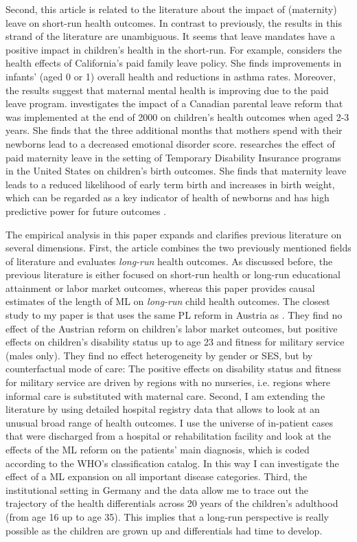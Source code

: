 \documentclass[11pt, a4paper,draft]{article} %
\begin{document}
Second, this article is related to the literature about the impact of (maternity) leave on short-run health outcomes. In contrast to previously, the results in  this strand of the literature are unambiguous. It seems that leave mandates have a positive impact in children's health in the short-run. For example, \cite{bullinger2019effect} considers the health effects of California's paid family leave policy. She finds improvements in infants' (aged 0 or 1) overall health and reductions in asthma rates. Moreover, the results suggest that maternal mental health is improving due to the paid leave program. \cite{sayour2019impact} investigates the impact of a Canadian parental leave reform that was implemented at the end of 2000 on children's health outcomes when aged 2-3 years. She finds that the three additional months that mothers spend with their newborns lead to a decreased emotional disorder score. \cite{stearns2015effects} researches the effect of paid maternity leave in the setting of Temporary Disability Insurance programs in the United States on children's birth outcomes. She finds that maternity leave leads to a reduced likelihood of early term birth and increases in birth weight, which can be regarded as a key indicator of health of newborns and has high predictive power for future outcomes \citep{currie2007biology}.

The empirical analysis in this paper expands and clarifies previous literature on several dimensions. First, the article combines the two previously mentioned fields of literature and evaluates \textit{long-run} health outcomes. As discussed before, the previous literature is either focused on short-run health or long-run educational attainment or labor market outcomes, whereas this paper provides causal estimates of the length of ML on \textit{long-run} child health outcomes. The closest study to my paper is \cite{danzer2019parental} that uses the same PL reform in Austria as \cite{danzer2017}. They find no effect of the Austrian reform on children's labor market outcomes, but positive effects on children's disability status up to age 23 and fitness for military service (males only). They find no effect heterogeneity by gender or SES, but by counterfactual mode of care: The positive effects on disability status and fitness for military service are driven by regions with no nurseries, i.e. regions where informal care is substituted with maternal care. Second, I am extending the literature by using detailed hospital registry data that allows to look at an unusual broad range of health outcomes. I use the universe of in-patient cases that were discharged from a hospital or rehabilitation facility and look at the effects of the ML reform on the patients' main diagnosis, which is coded according to the WHO's classification catalog. In this way I can investigate the effect of a ML expansion on all important disease categories. Third, the institutional setting in Germany and the data allow me to trace out the trajectory of the health differentials across 20 years of the children's adulthood (from age 16 up to age 35). This implies that a long-run perspective is really possible as the children are grown up and differentials had time to develop. \newline
\end{document}
